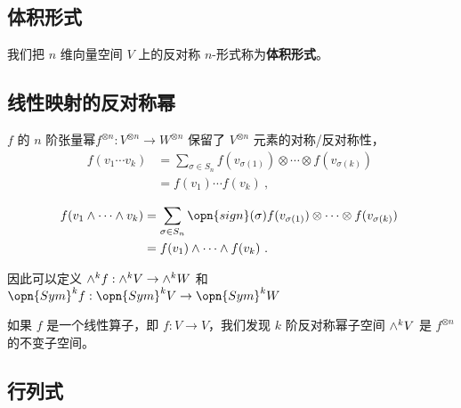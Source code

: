 
\begin{issues}
\issueDraft
\end{issues}


\subsection{体积形式}




我们把 $n$ 维向量空间 $V$ 上的反对称 $n$-形式称为\textbf{体积形式}。


\subsection{线性映射的反对称幂}

$f$ 的 $n$ 阶张量幂$f^{\otimes n}: V^{\otimes n} \to W^{\otimes n}$ 保留了 $V^{\otimes n}$ 元素的对称/反对称性，
\begin{equation}
\begin{aligned}
f(v_1 \cdots v_k) &= \sum_{\sigma \in S_n} f(v_{\sigma(1)}) \otimes \cdots \otimes f(v_{\sigma(k)}) \\
&= f(v_1) \cdots f(v_k)~,
\end{aligned}~
\end{equation}

\begin{equation}
\begin{aligned}
f(v_1 \wedge \cdots \wedge v_k) &= \sum_{\sigma \in S_n} \opn{sign}(\sigma) f(v_{\sigma(1)}) \otimes \cdots \otimes f(v_{\sigma(k)}) \\
&= f(v_1) \wedge \cdots \wedge f(v_k)~.
\end{aligned}~
\end{equation}

因此可以定义 ${\large \wedge}^k f: {\large \wedge}^k V \to {\large \wedge}^k W$ 和 $\opn{Sym}^k f: \opn{Sym}^k V \to \opn{Sym}^k W$

如果 $f$ 是一个线性算子，即 $f: V \to V$，我们发现 $k$ 阶反对称幂子空间 ${\large \wedge}^k V$ 是 $f^{\otimes n}$ 的不变子空间。

\subsection{行列式}

